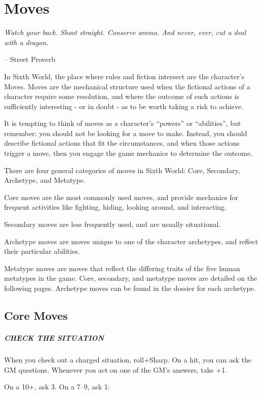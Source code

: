 \chapter{Moves} \label{moves}

\epigraph{\textit{Watch your back. Shoot straight. Conserve ammo. And never, ever, cut a deal with a dragon.}}{-- Street Proverb}

In Sixth World, the place where rules and fiction intersect are the character’s Moves. Moves are the mechanical structure used when the fictional actions of a character require some resolution, and where the outcome of such actions is sufficiently interesting - or in doubt - as to be worth taking a risk to achieve.

It is tempting to think of moves as a character’s ``powers'' or ``abilities'', but remember: you should not be looking for a move to make. Instead, you should describe fictional actions that fit the circumstances, and when those actions trigger a move, then you engage the game mechanics to determine the outcome.

There are four general categories of moves in Sixth World: Core, Secondary, Archetype, and Metatype.

Core moves are the most commonly used moves, and provide mechanics for frequent activities like fighting, hiding, looking around, and interacting.

Secondary moves are less frequently used, and are usually situational.

Archetype moves are moves unique to one of the character archetypes, and reflect their particular abilities.

Metatype moves are moves that reflect the differing traits of the five human metatypes in the game. Core, secondary, and metatype moves are detailed on the following pages. Archetype moves can be found in the dossier for each archetype.

\section{Core Moves}

\paragraph{CHECK THE SITUATION}
When you check out a charged situation, roll+Sharp. On a hit, you can ask the GM questions. Whenever you act on one of the GM’s answers, take +1.

On a 10+, ask 3. On a 7–9, ask 1:

